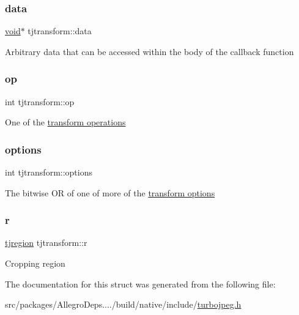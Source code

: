 \subsubsection{\texorpdfstring{data}{data}}
{\footnotesize\ttfamily \hyperlink{png_8h_ac9c84fa68bbad002983e35ce3663c686}{void}$\ast$ tjtransform\+::data}

Arbitrary data that can be accessed within the body of the callback function \mbox{\label{structtjtransform_a2525aab4ba6978a1c273f74fef50e498}} 
\subsubsection{\texorpdfstring{op}{op}}
{\footnotesize\ttfamily int tjtransform\+::op}

One of the \hyperlink{group___turbo_j_p_e_g_ga2de531af4e7e6c4f124908376b354866}{transform operations} \mbox{\label{structtjtransform_ac0e74655baa4402209a21e1ae481c8f6}} 
\subsubsection{\texorpdfstring{options}{options}}
{\footnotesize\ttfamily int tjtransform\+::options}

The bitwise OR of one of more of the \hyperlink{group___turbo_j_p_e_g_ga9c771a757fc1294add611906b89ab2d2}{transform options} \mbox{\label{structtjtransform_ac324e5e442abec8a961e5bf219db12cf}} 
\subsubsection{\texorpdfstring{r}{r}}
{\footnotesize\ttfamily \hyperlink{structtjregion}{tjregion} tjtransform\+::r}

Cropping region 

The documentation for this struct was generated from the following file\+:\begin{DoxyCompactItemize}
\item 
src/packages/\+Allegro\+Deps..../build/native/include/\hyperlink{turbojpeg_8h}{turbojpeg.\+h}\end{DoxyCompactItemize}
